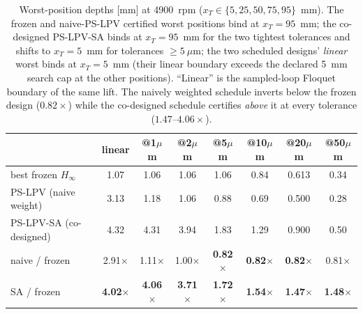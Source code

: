 \documentclass[preprint,12pt]{elsarticle}
\newcommand{\hinf}{H_\infty}
\begin{document}
\begin{table}[t]
\centering\small
\caption{Worst-position depths [mm] at 4900~rpm
($x_T \in \{5,25,50,75,95\}$~mm). The frozen and naive-PS-LPV certified
worst positions bind at $x_T = 95$~mm; the co-designed PS-LPV-SA binds
at $x_T = 95$~mm for the two tightest tolerances and shifts to
$x_T = 5$~mm for tolerances $\ge 5~\mu$m; the two scheduled designs'
\emph{linear} worst binds at $x_T = 5$~mm (their linear boundary exceeds
the declared 5~mm search cap at the other positions). ``Linear'' is the
sampled-loop Floquet boundary of the same lift. The naively weighted
schedule inverts below the frozen design ($0.82\times$) while the
co-designed schedule certifies \emph{above} it at every tolerance
($1.47$--$4.06\times$).}
\label{tab:satranking}
\begin{tabular}{lccccccc}
\toprule
 & linear & @1$\mu$m & @2$\mu$m & @5$\mu$m & @10$\mu$m & @20$\mu$m &
@50$\mu$m \\
\midrule
best frozen $\hinf$        & 1.07 & 1.06 & 1.06 & 1.06 & 0.84 & 0.613 & 0.34\\
PS-LPV (naive weight)      & 3.13 & 1.18 & 1.06 & 0.88 & 0.69 & 0.500 & 0.28\\
PS-LPV-SA (co-designed)    & 4.32 & 4.31 & 3.94 & 1.83 & 1.29 & 0.900 & 0.50\\
\midrule
naive / frozen & 2.91$\times$ & 1.11$\times$ & 1.00$\times$ &
\textbf{0.82$\times$} & \textbf{0.82$\times$} & \textbf{0.82$\times$} &
0.81$\times$ \\
SA / frozen & \textbf{4.02$\times$} & \textbf{4.06$\times$} &
\textbf{3.71$\times$} & \textbf{1.72$\times$} & \textbf{1.54$\times$} &
\textbf{1.47$\times$} & \textbf{1.48$\times$} \\
\bottomrule
\end{tabular}
\end{table}
\end{document}
